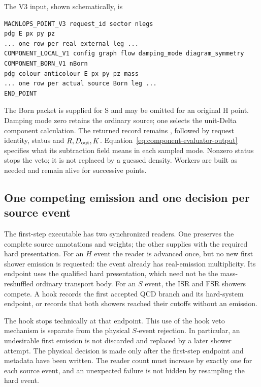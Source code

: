\noindent\begin{minipage}{\linewidth}
The V3 input, shown schematically, is
\begin{lstlisting}
MACNLOPS_POINT_V3 request_id sector nlegs
pdg E px py pz
... one row per real external leg ...
COMPONENT_LOCAL_V1 config graph flow damping_mode diagram_symmetry
COMPONENT_BORN_V1 nBorn
pdg colour anticolour E px py pz mass
... one row per actual source Born leg ...
END_POINT
\end{lstlisting}
\end{minipage}
\par\smallskip
The Born packet is supplied for S and may be omitted for an original
H point. Damping mode zero retains the ordinary source; one selects
the unit-Delta component calculation. The returned record remains
, followed by request identity, status and
$R,D_{\rm out},K$. Equation~\eqref{eq:component-evaluator-output}
specifies what its subtraction field means in each sampled mode.
Nonzero status stops the veto; it is not replaced by a guessed density.
Workers are built as needed and remain alive for successive points.

\subsection{One competing emission and one decision per source event}
\label{sec:impl-first-step}

The first-step executable has two synchronized readers.  One preserves
the complete source annotations and weights; the other supplies
\pythia{} with the required hard presentation.  For an \(H\) event the
reader is advanced once, but no new first shower emission is requested:
the event already has real-emission multiplicity.  Its endpoint uses the
qualified hard presentation, which need not be the mass-reshuffled
ordinary transport body.  For an \(S\) event,
the ISR and FSR showers compete.  A hook records the first accepted QCD
branch and its hard-system endpoint, or records that both showers
reached their cutoffs without an emission.

The hook stops \pythia{} technically at that endpoint.  This use of the
hook veto mechanism is separate from the physical \(S\)-event
rejection.  In particular, an undesirable first emission is not
discarded and replaced by a later shower attempt.  The physical
decision is made only after the first-step endpoint and metadata have
been written.  The reader count must increase by exactly one for each
source event, and an unexpected \pythia{} failure is not hidden by
resampling the hard event.

